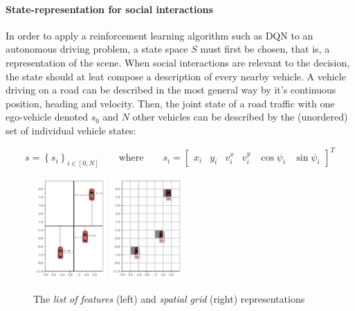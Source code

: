\documentclass{article}
\begin{document}
\paragraph{State-representation for social interactions}{

In order to apply a reinforcement learning algorithm such as DQN to an autonomous driving problem, a state space $S$ must first be chosen, that is, a representation of the scene. When social interactions are relevant to the decision, the state should at leat compose a description of every nearby vehicle. A vehicle driving on a road can be described in the most general way by it's continuous position, heading and velocity. Then, the joint state of a road traffic with one ego-vehicle denoted $s_0$ and $N$ other vehicles can be described by the (unordered) set of individual vehicle states:

\begin{equation*}
s = \left\lbrace s_i \right\rbrace_{i \in [0, N]}\qquad
\text{where}\qquad
s_i = \begin{bmatrix}
x_i & y_i & v^x_i & v^y_i & \cos\psi_i & \sin \psi_i
\end{bmatrix}^T
\end{equation*}


\begin{figure}[tp]
	\centering
	\includegraphics[width=0.25\textwidth]{img/coordinates}
	\includegraphics[width=0.25\textwidth]{img/map}
	\caption{The \emph{list of features} (left) and \emph{spatial grid} (right) representations}
	\label{fig:representation}
\end{figure}

}
\end{document}
